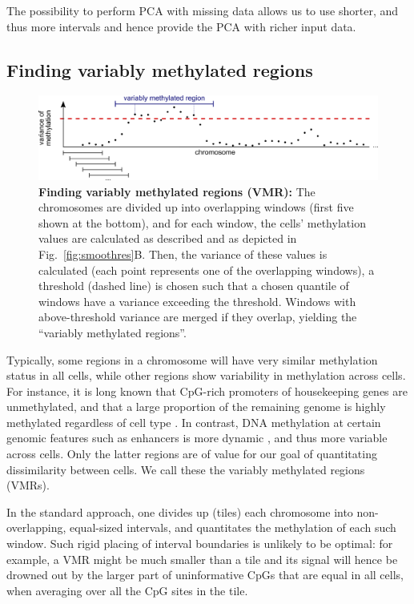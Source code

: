 \documentclass[twocolumn,10pt]{article}
\begin{document}
The possibility to perform PCA with missing data allows us to use shorter, and thus more intervals and hence provide the PCA with richer input data.

\subsection{Finding variably methylated regions}

\begin{figure}
    \includegraphics[width=\columnwidth]{figures/Fig_sliding.png}
    \caption{\small \textbf{Finding variably methylated regions (VMR):} The chromosomes are divided up into overlapping windows (first five shown at the bottom), and for each window, the cells' methylation values are calculated as described and as depicted in Fig.\ \ref{fig:smoothres}B. Then, the variance of these values is calculated (each point represents one of the overlapping windows), a threshold (dashed line) is chosen such that a chosen quantile of windows have a variance exceeding the threshold. Windows with above-threshold variance are merged if they overlap, yielding the ``variably methylated regions''.}
    \label{vmr}
\end{figure}


Typically, some regions in a chromosome will have very similar methylation status in all cells, while other regions show variability in methylation across cells. For instance, it is long known that CpG-rich promoters of housekeeping genes are unmethylated, and that a large proportion of the remaining genome is highly methylated regardless of cell type \citep{bird1986cpg}. In contrast, DNA methylation at certain genomic features such as enhancers is more dynamic \citep{argelaguet2019gastru}, and thus more variable across cells.
Only the latter regions are of value for our goal of quantitating dissimilarity between cells. We call these the variably methylated regions (VMRs).

In the standard approach, one divides up (tiles) each chromosome into non-overlapping, equal-sized intervals, and quantitates the methylation of each such window. Such rigid placing of interval boundaries is unlikely to be optimal: for example, a VMR might be much smaller than a tile and its signal will hence be drowned out by the larger part of uninformative CpGs that are equal in all cells, when averaging over all the CpG sites in the tile.
\end{document}
